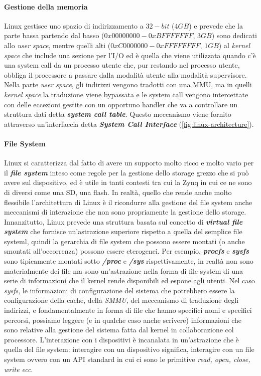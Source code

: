 \documentclass{article}
\begin{document}
\paragraph{Gestione della memoria}
Linux gestisce uno spazio di indirizzamento a $32-bit$ ($4GB$) e prevede che la parte bassa partendo dal basso ($0x00000000-0xBFFFFFFF$, $3GB$) sono dedicati allo \textit{user space}, mentre quelli alti ($0xC0000000-0xFFFFFFFF$, $1GB$) al \textit{kernel space} che include una sezione per l'I/O ed è quella che viene utilizzata quando c'è una system call da un processo utente che, pur restando nel processo utente, obbliga il processore a passare dalla modalità utente alla modalità supervisore. Nella parte \textit{user space}, gli indirizzi vengono tradotti con una MMU, ma in quelli \textit{kernel space} la traduzione viene bypassata e le system call vengono intercettate con delle eccezioni gestite con un opportuno handler che va a controllare un struttura dati detta \textbf{\textit{system call table}}. Questo meccanismo viene fornito attraverso un'interfaccia detta \textbf{\textit{System Call Interface}} (\cref{fig:linux-architecture}).

\paragraph{File System}
Linux si caratterizza dal fatto di avere un supporto molto ricco e molto vario per il \textbf{\textit{file system}} inteso come regole per la gestione dello storage grezzo che si può avere sul dispositivo, ed è utile in tanti contesti tra cui la Zynq in cui ce ne sono di diversi come una SD, una flash. In realtà, quello che rende anche molto flessibile l’architettura di Linux è il ricondurre alla gestione del file system anche meccanismi di interazione che non sono propriamente la gestione dello storage. Innanzitutto, Linux prevede una struttura basata sul concetto di \textbf{\textit{virtual file system}} che fornisce un’astrazione superiore rispetto a quella del semplice file systeml, quindi la gerarchia di file system che possono essere montati (o anche smontati all’occorrenza) possono essere eterogenei. Per esempio, \textbf{\textit{procfs}} e \textbf{\textit{sysfs}} sono tipicamente montati sotto \textbf{\textit{/proc}} e \textbf{\textit{/sys}} rispettivamente, in realtà non sono materialmente dei file  ma sono un’astrazione nella forma di file system di una serie di informazioni che il kernel rende disponibili ed espone agli utenti. Nel caso \textit{sysfs}, le informazioni di configurazione del sistema che potrebbero essere la configurazione della cache, della \textit{SMMU}, del meccanismo di traduzione degli indirizzi, e fondamentalmente in forma di file che hanno specifici nomi e specifici percorsi, possiamo leggere (e in qualche caso anche scrivere) informazioni che sono relative alla gestione del sistema fatta dal kernel in collaborazione col processore. L'interazione con i dispositivi è incanalata in un’astrazione che è quella del file system: interagire con un dispositivo significa, interagire con un file system ovvero con un API standard in cui ci sono le primitive \textit{read, open, close, write ecc}.
\end{document}

